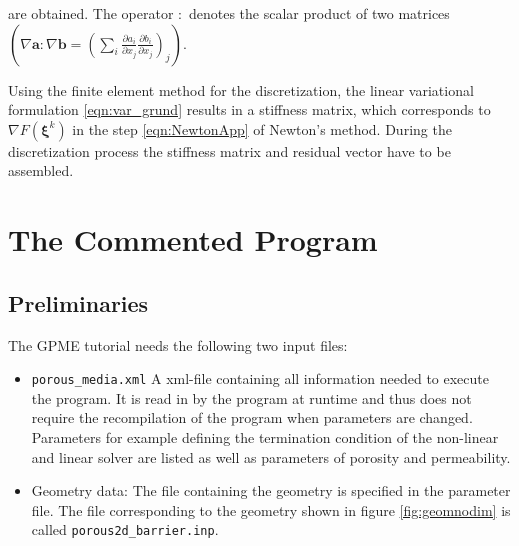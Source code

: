 \documentclass{article}
\newcommand{\vect}[1]{\mathbf{#1}}
\newcommand{\bol}[1]{\boldsymbol{#1}}
\begin{document}
are obtained. The operator $:$ denotes the scalar product of two matrices $(\nabla \vect a : \nabla \vect b = (\sum_i\frac{\partial a_i}{\partial x_j}\frac{\partial b_i}{\partial x_j})_j)$.

Using the finite element method for the discretization, the linear variational formulation \eqref{eqn:var_grund} results
in a stiffness matrix, which corresponds to $\nabla F (\bol \xi ^ {k})$ in the step \eqref{eqn:NewtonApp} of Newton’s method. During
the discretization process the stiffness matrix and residual vector have to be assembled.

\pagebreak
\section{The Commented Program}
\label{ch:program}


\subsection{Preliminaries}

The GPME tutorial needs the following two input files:

\begin{itemize}
\item \texttt{porous\_media.xml} A xml-file containing all information needed to execute the program. It is read in by the program at runtime and thus does not require the recompilation of the program when parameters are changed. Parameters for example defining the termination condition of the non-linear and linear solver are listed as well as parameters of porosity and permeability.

 \item Geometry data: The file containing the geometry is specified in the parameter file. The file corresponding to the geometry shown in figure \ref{fig:geomnodim} is called \texttt{porous2d\_barrier.inp}.
\end{itemize}
\end{document}
